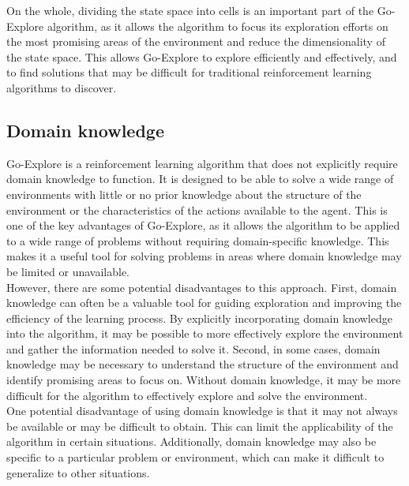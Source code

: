 \documentclass[runningheads]{llncs}%
\begin{document}
On the whole, dividing the state space into cells is an important part of the Go-Explore algorithm, as it allows the algorithm to focus its exploration efforts on the most promising areas of the environment and reduce the dimensionality of the state space. This allows Go-Explore to explore efficiently and effectively, and to find solutions that may be difficult for traditional reinforcement learning algorithms to discover.

\subsection{Domain knowledge}

Go-Explore is a reinforcement learning algorithm that does not explicitly require domain knowledge to function. It is designed to be able to solve a wide range of environments with little or no prior knowledge about the structure of the environment or the characteristics of the actions available to the agent. This is one of the key advantages of Go-Explore, as it allows the algorithm to be applied to a wide range of problems without requiring domain-specific knowledge. This makes it a useful tool for solving problems in areas where domain knowledge may be limited or unavailable.\\

However, there are some potential disadvantages to this approach. First, domain knowledge can often be a valuable tool for guiding exploration and improving the efficiency of the learning process. By explicitly incorporating domain knowledge into the algorithm, it may be possible to more effectively explore the environment and gather the information needed to solve it. Second, in some cases, domain knowledge may be necessary to understand the structure of the environment and identify promising areas to focus on. Without domain knowledge, it may be more difficult for the algorithm to effectively explore and solve the environment.\\

One potential disadvantage of using domain knowledge is that it may not always be available or may be difficult to obtain. This can limit the applicability of the algorithm in certain situations. Additionally, domain knowledge may also be specific to a particular problem or environment, which can make it difficult to generalize to other situations. 
\end{document}

